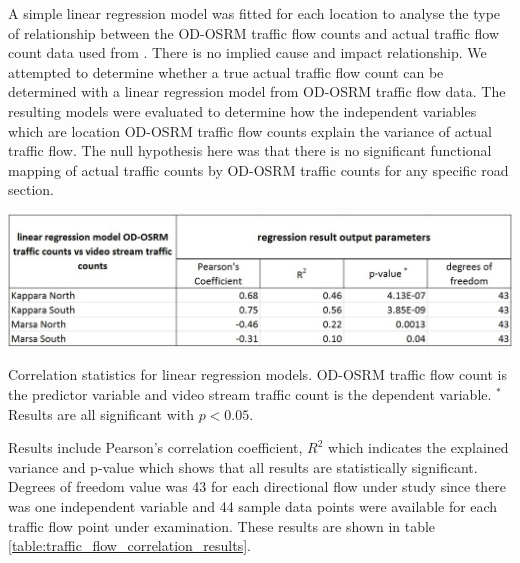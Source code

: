 \documentclass[12pt, a4paper]{report}
\theoremstyle{definition}
\theoremstyle{definition}%
\theoremstyle{definition}%
\theoremstyle{definition}%
\theoremstyle{definition}%
\theoremstyle{definition}%
\begin{document}
A simple linear regression model was fitted for each location to analyse the type of relationship between the OD-OSRM traffic flow counts and actual traffic flow count data used from \cite{Pace2017}. There is no implied cause and impact relationship. We attempted to determine whether a true actual traffic flow count can be determined with a linear regression model from OD-OSRM traffic flow data. The resulting models were evaluated to determine how the independent variables which are location OD-OSRM traffic flow counts explain the variance of actual traffic flow. The null hypothesis here was that there is no significant functional mapping of actual traffic counts by OD-OSRM traffic counts for any specific road section.


\begin{table}[!]	
	\includegraphics[scale=0.4]{traffic_flow_counts_correlation_results.jpg}
	\centering
	\caption[Correlation statistics for traffic flow linear regression models]{Correlation statistics for linear regression models. OD-OSRM traffic flow count is the predictor variable and video stream traffic count is the dependent variable. $^*$Results are all significant with $p < 0.05$.}
	\label{table:traffic_flow_correlation_results}
\end{table}

Results include Pearson's correlation coefficient, $R^2$ which indicates the explained variance and p-value which shows that all results are statistically significant. Degrees of freedom value was 43 for each directional flow under study since there was one independent variable and 44 sample data points were available for each traffic flow point under examination. These results are shown in table \ref{table:traffic_flow_correlation_results}. 
\end{document}
